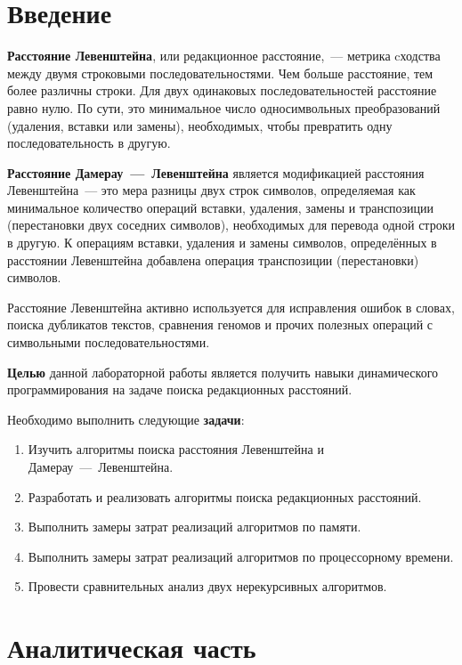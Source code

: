 \chapter*{Введение}

\textbf{Расстояние Левенштейна}, или редакционное расстояние,~--- метрика cходства между двумя строковыми последовательностями. Чем больше расстояние, тем более различны строки. Для двух одинаковых последовательностей расстояние равно нулю. По сути, это минимальное число односимвольных преобразований (удаления, вставки или замены), необходимых, чтобы превратить одну последовательность в другую.

\textbf{Расстояние Дамерау~---~Левенштейна} является модификацией расстояния Левенштейна~--- это мера разницы двух строк символов, определяемая как минимальное количество операций вставки, удаления, замены и транспозиции (перестановки двух соседних символов), необходимых для перевода одной строки в другую. К операциям вставки, удаления и замены символов, определённых в расстоянии Левенштейна добавлена операция транспозиции (перестановки) символов.

Расстояние Левенштейна активно используется для исправления ошибок в словах, поиска дубликатов текстов, сравнения геномов и прочих полезных операций с символьными последовательностями.

\textbf{Целью} данной лабораторной работы является получить навыки динамического программирования на задаче поиска редакционных расстояний.

Необходимо выполнить следующие \textbf{задачи}:
\begin{enumerate}
    \item Изучить алгоритмы поиска расстояния Левенштейна и Дамерау~---~Левенштейна.
    \item Разработать и реализовать алгоритмы поиска редакционных расстояний.
    \item Выполнить замеры затрат реализаций алгоритмов по памяти.
    \item Выполнить замеры затрат реализаций алгоритмов по процессорному времени.
    \item Провести сравнительных анализ двух нерекурсивных алгоритмов.
\end{enumerate}


\chapter{Аналитическая часть}

